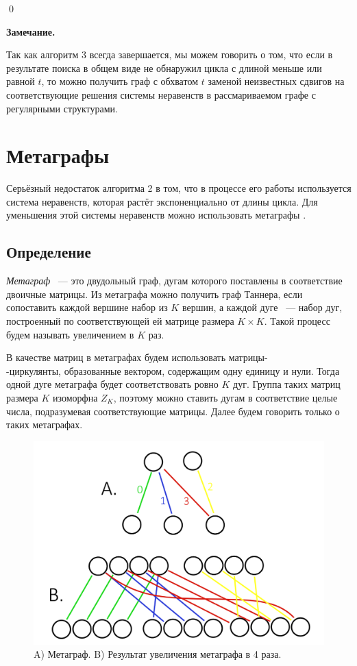 \documentclass[14pt]{mmcs-article}
\begin{document}
\qed

\textbf{Замечание.}

Так как алгоритм 3 всегда завершается, мы можем говорить о том, что если в результате поиска в общем виде не обнаружил цикла с длиной меньше или равной $t$, то можно получить граф с обхватом $t$ заменой неизвестных сдвигов на соответствующие решения системы неравенств в рассмариваемом графе с регулярными структурами.

\newpage
\section{Метаграфы}

Серьёзный недостаток алгоритма 2 в том, что в процессе его работы используется система неравенств, которая растёт экспоненциально от длины цикла. Для уменьшения этой системы неравенств можно использовать метаграфы \cite{metagraphs}.

\subsection{Определение}

\textsl{Метаграф} ~--- это двудольный граф, дугам которого поставлены в соответствие двоичные матрицы. Из метаграфа можно получить граф Таннера, если сопоставить каждой вершине набор из $K$ вершин, а каждой дуге ~--- набор дуг, построенный по соответствующей ей матрице размера $K \times K$. Такой процесс будем называть увеличением в $K$ раз. 

В качестве матриц в метаграфах будем использовать матрицы-\\-циркулянты, образованные вектором, содержащим одну единицу и нули. Тогда одной дуге метаграфа будет соответствовать ровно $K$ дуг. Группа таких матриц размера $K$ изоморфна $Z_K$, поэтому можно ставить дугам в соответствие целые числа, подразумевая соответствующие матрицы. Далее будем говорить только о таких метаграфах.

\begin{figure}[H]
  \centering
  \includegraphics[scale=0.35]{Fig_8.png}
  \caption{ A) Метаграф. B) Результат увеличения метаграфа в 4 раза. }
  \label{metagraph:1}
\end{figure}
\end{document}

